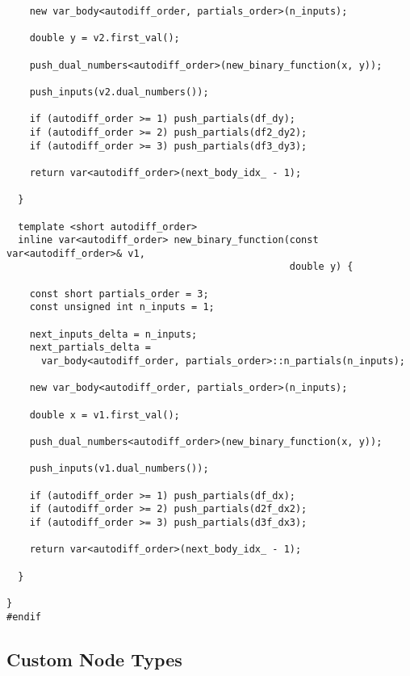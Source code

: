 \begin{verbatim}
    new var_body<autodiff_order, partials_order>(n_inputs);
    
    double y = v2.first_val();
    
    push_dual_numbers<autodiff_order>(new_binary_function(x, y));
    
    push_inputs(v2.dual_numbers());
    
    if (autodiff_order >= 1) push_partials(df_dy);
    if (autodiff_order >= 2) push_partials(df2_dy2);
    if (autodiff_order >= 3) push_partials(df3_dy3);
    
    return var<autodiff_order>(next_body_idx_ - 1);
    
  }
  
  template <short autodiff_order>
  inline var<autodiff_order> new_binary_function(const var<autodiff_order>& v1,
                                                 double y) {
    
    const short partials_order = 3;
    const unsigned int n_inputs = 1;
    
    next_inputs_delta = n_inputs;
    next_partials_delta =
      var_body<autodiff_order, partials_order>::n_partials(n_inputs);
    
    new var_body<autodiff_order, partials_order>(n_inputs);
    
    double x = v1.first_val();
    
    push_dual_numbers<autodiff_order>(new_binary_function(x, y));
    
    push_inputs(v1.dual_numbers());
    
    if (autodiff_order >= 1) push_partials(df_dx);
    if (autodiff_order >= 2) push_partials(d2f_dx2);
    if (autodiff_order >= 3) push_partials(d3f_dx3);
    
    return var<autodiff_order>(next_body_idx_ - 1);
    
  }

}
#endif
\end{verbatim}

\subsection{Custom Node Types}

